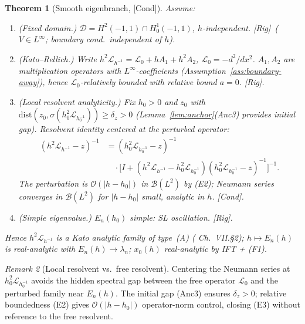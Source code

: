 \documentclass[12pt,a4paper]{amsart}
\newtheorem{theorem}{Theorem}[section]
\theoremstyle{definition}
\theoremstyle{remark}
\newtheorem{remark}[theorem]{Remark}
\newcommand{\Rig}{\textup{[Rig]}}
\newcommand{\Cond}{\textup{[Cond]}}
\begin{document}
\begin{theorem}[Smooth eigenbranch, \Cond]
\label{thm:eigenbranch}
Assume:
\begin{enumerate}[{\rm(E1)}]
\item \textit{(Fixed domain.)} $\mathcal{D}=H^2(-1,1)\cap H^1_0(-1,1)$,
  $h$-independent. \Rig\ ($V\in L^\infty$; boundary cond.\ independent of $h$).
\item \textit{(Kato--Rellich.)}
  Write $h^2\mathcal{L}_{h^{-1}}=\mathcal{L}_0+hA_1+h^2A_2$,
  $\mathcal{L}_0=-d^2/dx^2$.
  $A_1,A_2$ are multiplication operators with $L^\infty$-coefficients
  (Assumption~\ref{ass:boundary-away}),
  hence $\mathcal{L}_0$-relatively bounded with relative bound $a=0$. \Rig.
\item \textit{(Local resolvent analyticity.)}
  Fix $h_0>0$ and $z_0$ with
  $\mathrm{dist}(z_0,\sigma(h_0^2\mathcal{L}_{h_0^{-1}}))\ge\delta_z>0$
  (Lemma~\ref{lem:anchor}(Anc3) provides initial gap).
  Resolvent identity centered at the \emph{perturbed} operator:
  \begin{align*}
    (h^2\mathcal{L}_{h^{-1}}-z)^{-1}
    &= (h_0^2\mathcal{L}_{h_0^{-1}}-z)^{-1}\\
    &\quad\cdot\bigl[I+(h^2\mathcal{L}_{h^{-1}}-h_0^2\mathcal{L}_{h_0^{-1}})
      (h_0^2\mathcal{L}_{h_0^{-1}}-z)^{-1}\bigr]^{-1}.
  \end{align*}
  The perturbation is $\mathcal{O}(|h-h_0|)$ in $\mathcal{B}(L^2)$ by (E2);
  Neumann series converges in $\mathcal{B}(L^2)$ for $|h-h_0|$ small,
  analytic in $h$. \Cond.
\item \textit{(Simple eigenvalue.)} $E_n(h_0)$ simple: SL oscillation. \Rig.
\end{enumerate}
Hence $h^2\mathcal{L}_{h^{-1}}$ is a Kato analytic family of type~(A)
(\cite{Kato1966} Ch.~VII.\S2);
$h\mapsto E_n(h)$ is real-analytic with $E_n(h)\to\lambda_n$;
$x_0(h)$ real-analytic by IFT + (F1).
\end{theorem}

\begin{remark}[Local resolvent vs.\ free resolvent]
Centering the Neumann series at $h_0^2\mathcal{L}_{h_0^{-1}}$
avoids the hidden spectral gap between the free operator $\mathcal{L}_0$
and the perturbed family near $E_n(h)$.
The initial gap (Anc3) ensures $\delta_z>0$;
relative boundedness (E2) gives $\mathcal{O}(|h-h_0|)$ operator-norm control,
closing (E3) without reference to the free resolvent.
\end{remark}

\end{document}
